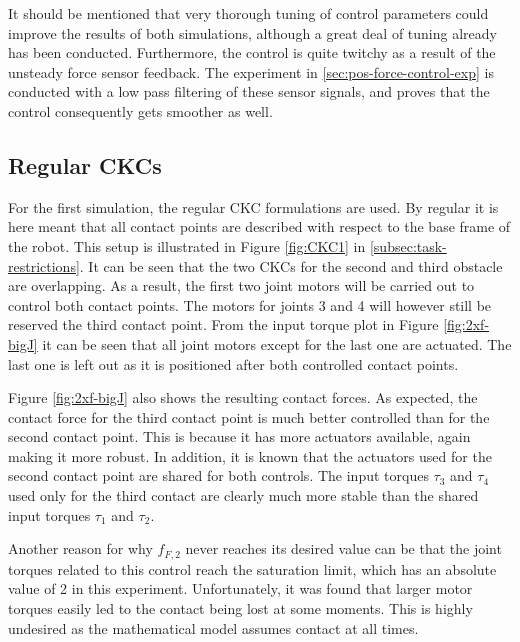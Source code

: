 It should be mentioned that very thorough tuning of control parameters could improve the results of both simulations, although a great deal of tuning already has been conducted. Furthermore, the control is quite twitchy as a result of the unsteady force sensor feedback. The experiment in \ref{sec:pos-force-control-exp} is conducted with a low pass filtering of these sensor signals, and proves that the control consequently gets smoother as well.

\newpage
\subsection{Regular CKCs}

For the first simulation, the regular CKC formulations are used. By regular it is here meant that all contact points are described with respect to the base frame of the robot. This setup is illustrated in Figure \ref{fig:CKC1} in \ref{subsec:task-restrictions}. It can be seen that the two CKCs for the second and third obstacle are overlapping. As a result, the first two joint motors will be carried out to control both contact points. The motors for joints 3 and 4 will however still be reserved the third contact point. From the input torque plot in Figure \ref{fig:2xf-bigJ} it can be seen that all joint motors except for the last one are actuated. The last one is left out as it is positioned after both controlled contact points. 

Figure \ref{fig:2xf-bigJ} also shows the resulting contact forces. As expected, the contact force for the third contact point is much better controlled than for the second contact point. This is because it has more actuators available, again making it more robust. In addition, it is known that the actuators used for the second contact point are shared for both controls. The input torques $\tau_3$ and $\tau_4$ used only for the third contact are clearly much more stable than the shared input torques $\tau_1$ and $\tau_2$.

Another reason for why $f_{F,2}$ never reaches its desired value can be that the joint torques related to this control reach the saturation limit, which has an absolute value of 2 in this experiment. Unfortunately, it was found that larger motor torques easily led to the contact being lost at some moments. This is highly undesired as the mathematical model assumes contact at all times.

